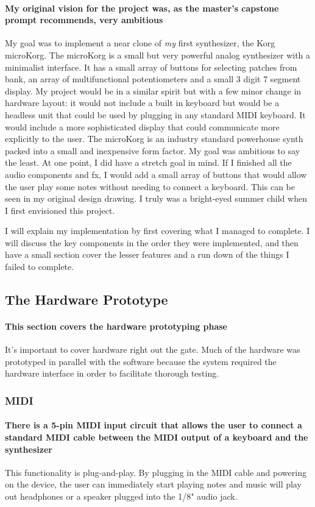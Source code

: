 \documentclass[acmlarge,screen]{acmart}
\begin{document}
	\paragraph{My original vision for the project was, as the master's capstone prompt recommends, very ambitious} My goal was to implement a near clone of \textit{my} first synthesizer, the Korg microKorg. The microKorg is a small but very powerful analog synthesizer with a minimalist interface. It has a small array of buttons for selecting patches from bank, an array of multifunctional potentiometers and a small 3 digit 7 segment display. My project would be in a similar spirit but with a few minor change in hardware layout: it would not include a built in keyboard but would be a headless unit that could be used by plugging in any standard MIDI keyboard. It would include a more sophisticated display that could communicate more explicitly to the user. The microKorg is an industry standard powerhouse synth packed into a small and inexpensive form factor. My goal was ambitious to say the least. At one point, I did have a stretch goal in mind. If I finished all the audio components and fx, I would add a small array of buttons that would allow the user play some notes without needing to connect a keyboard. This can be seen in my original design drawing. I truly was a bright-eyed summer child when I first envisioned this project.

	I will explain my implementation by first covering what I managed to complete. I will discuss the key components in the order they were implemented, and then have a small section cover the lesser features and a run down of the things I failed to complete.

\subsection{The Hardware Prototype}
	\paragraph{This section covers the hardware prototyping phase} It's important to cover hardware right out the gate. Much of the hardware was prototyped in parallel with the software because the system required the hardware interface in order to facilitate thorough testing.

	\subsubsection{MIDI}
	\paragraph{There is a 5-pin MIDI input circuit that allows the user to connect a standard MIDI cable between the MIDI output of a keyboard and the synthesizer} This functionality is plug-and-play. By plugging in the MIDI cable and powering on the device, the user can immediately start playing notes and music will play out headphones or a speaker  plugged into the 1/8" audio jack.
	
\end{document}
